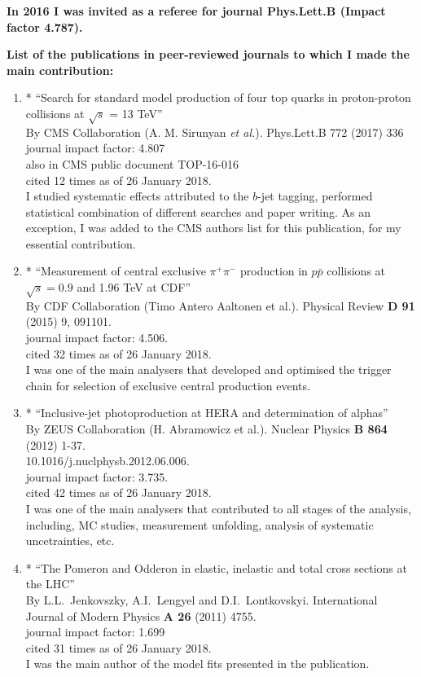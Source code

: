 \textbf{In 2016 I was invited as a referee for journal \textbf{Phys.Lett.B} (Impact factor 4.787).}
\begin{flushleft}
\textbf{List of the publications in peer-reviewed journals to which I made the main contribution:}\\
\end{flushleft}
\begin{enumerate}
	\item* ``Search for standard model production of four top quarks in proton-proton collisions at $\sqrt{s}$ = 13 TeV''\\
	By CMS Collaboration (A. M. Sirunyan {\it et al.}).	Phys.Lett.B 772 (2017) 336\\
	journal impact factor: 4.807\\
	also in CMS public document TOP-16-016\\
	cited 12 times as of 26 January 2018.\\
	I studied systematic effects attributed to the $b$-jet tagging, performed statistical combination of different searches and paper writing. As an exception, I was added to the CMS authors list for this publication, for my essential contribution.
	\item* ``Measurement of central exclusive $\pi^+ \pi^-$ production in $p\bar{p}$ collisions at $\sqrt{s} = 0.9$ and 1.96 TeV at CDF''\\
	By CDF Collaboration (Timo Antero Aaltonen et al.).	Physical Review \textbf{D 91} (2015) 9, 091101. \\
	journal impact factor:  4.506. \\
	cited 32 times as of 26 January 2018.\\
	I was one of the main analysers that developed and optimised the trigger chain for selection of exclusive central production events.
	\item* ``Inclusive-jet photoproduction at HERA and determination of alphas''\\
	By ZEUS Collaboration (H. Abramowicz et al.). 	Nuclear Physics \textbf{B 864} (2012) 1-37.\\
	10.1016/j.nuclphysb.2012.06.006.\\
	journal impact factor:  3.735. \\
	cited 42 times as of 26 January 2018. \\
	I was one of the main analysers that contributed to all stages of the analysis, including, MC studies, measurement unfolding, analysis of systematic uncetrainties, etc.
	\item*  ``The Pomeron and Odderon in elastic, inelastic and total cross sections at the LHC''\\
	By  L.L.~Jenkovszky, A.I.~Lengyel and D.I.~Lontkovskyi. International  Journal of Modern Physics {\bf A 26} (2011) 4755.\\
    journal impact factor:  1.699\\
	cited 31 times as of 26 January 2018. \\
	I was the main author of the model fits presented in the publication.
\end{enumerate}

